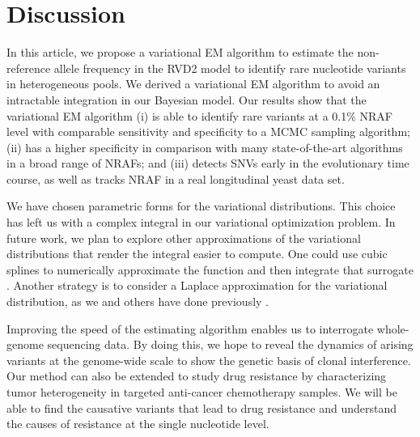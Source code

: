 \documentclass{bmcart}
\begin{document}
\section*{Discussion}
In this article, we propose a variational EM algorithm to estimate the non-reference allele frequency in the RVD2 model to identify rare nucleotide variants in heterogeneous pools.
We derived a variational EM algorithm to avoid an intractable integration in our Bayesian model.
Our results show that the variational EM algorithm
(i) is able to identify rare variants at a 0.1\% NRAF level with comparable sensitivity and specificity to a MCMC sampling algorithm;
(ii) has a higher specificity in comparison with many state-of-the-art algorithms in a broad range of NRAFs;
and (iii) detects SNVs early in the evolutionary time course, as well as tracks NRAF in a real longitudinal yeast data set.

We have chosen parametric forms for the variational distributions.
This choice has left us with a complex integral in our variational optimization problem.
In future work, we plan to explore other approximations of the variational distributions that render the integral easier to compute.
One could use cubic splines to numerically approximate the function and then integrate that surrogate \cite{mckinley1998cubic}.
Another strategy is to consider a Laplace approximation for the variational distribution, as we and others have done previously \cite{saddiki2014glad, wang2013variational}.


Improving the speed of the estimating algorithm enables us to interrogate whole-genome sequencing data.
By doing this, we hope to reveal the dynamics of arising variants at the genome-wide scale to show the genetic basis of clonal interference.
Our method can also be extended to study drug resistance by characterizing tumor heterogeneity in targeted anti-cancer chemotherapy samples.
We will be able to find the causative variants that lead to drug resistance and understand the causes of resistance at the single nucleotide level.
\end{document}
